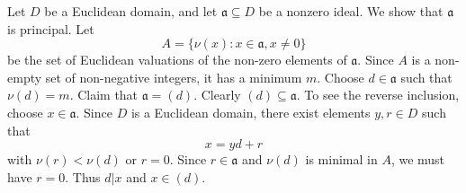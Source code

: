 \documentclass[12pt]{article}
\begin{document}
Let $D$ be a Euclidean domain, and let $\mathfrak{a} \subseteq D$ be a nonzero ideal. We show that $\mathfrak{a}$ is principal. Let
\[ A = \{\nu(x) : x \in \mathfrak{a}, x \neq 0\} \]
be the set of Euclidean valuations of the non-zero elements of $\mathfrak{a}$. Since $A$ is a non-empty set of non-negative integers, it has a minimum $m$. Choose $d\in \mathfrak{a}$ such that $\nu(d) = m$. Claim that $\mathfrak{a} = (d)$. Clearly $(d) \subseteq \mathfrak{a}$. To see the reverse inclusion, choose $x\in \mathfrak{a}$. Since $D$ is a Euclidean domain, there exist elements $y,r\in D$ such that
\[ x = yd + r \]
with $\nu(r) < \nu(d)$ or $r = 0$. Since $r \in \mathfrak{a}$ and $\nu(d)$ is minimal in $A$, we must have $r = 0$. Thus $d \lvert x$ and $x\in(d)$.
\end{document}
